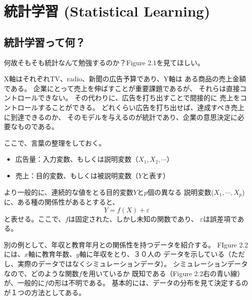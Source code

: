 \documentclass{jsbook}
\begin{document}
%
\setlength{\baselineskip}{2em} %
\setcounter{chapter}{1}
\chapter{統計学習 (Statistical Learning)}
\section{統計学習って何？}
何故そもそも統計なんて勉強するのか？Figure 2.1を見てほしい。

X軸はそれぞれTV、radio、新聞の広告予算であり、Y軸は
ある商品の売上金額である。
企業にとって売上を伸ばすことが重要課題であるが、
それらは直接コントロールできない。
その代わりに、広告を打ち出すことで間接的に
売上をコントロールすることができる。
どれくらい広告を打ち出せば、達成すべき売上に到達できるのか、
そのモデルを与えるのが統計であり、企業の意思決定に必要なものである。




ここで、言葉の整理をしておく。
\begin{itemize}
\item 広告量：入力変数、もしくは説明変数（$X_1, X_2, \cdots$）
\item 売上：目的変数、もしくは被説明変数（$Y$と表す）
\end{itemize}

より一般的に、連続的な値をとる目的変数$Y$と$p$個の異なる
説明変数($X_1, \cdots, X_p$)に、ある種の関係性があるとすると、
\begin{equation}
  Y = f(X) + \varepsilon
\end{equation}
と表せる。ここで、$f$は固定された、しかし未知の関数であり、
$\varepsilon$は誤差項である。

別の例として、年収と教育年月との関係性を持つデータを紹介する。
FIgure 2.2には、$x$軸に教育年数、$y$軸に年収をとり、３０人の
データを示している（ただし、実際のデータではなくシミュレーションデータ）。
シミュレーションデータなので、どのような関数$f$を用いているか
既知である（Figure 2.2右の青い線）が、一般的に$f$の形は不明である。
基本的には、データの分布を見て決定するのが１つの方法としてある。
\end{document}
